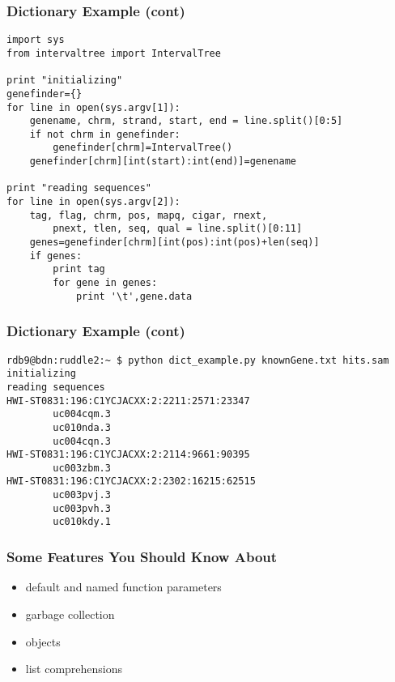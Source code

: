 \documentclass[10pt]{beamer}
\newcommand\smallfont{\fontsize{8pt}{7.2}\selectfont}
\begin{document}
\begin{frame}[fragile]
\frametitle{Dictionary Example (cont)}

\smallfont
\begin{verbatim}
import sys
from intervaltree import IntervalTree

print "initializing"
genefinder={}
for line in open(sys.argv[1]):
    genename, chrm, strand, start, end = line.split()[0:5]
    if not chrm in genefinder:
        genefinder[chrm]=IntervalTree()
    genefinder[chrm][int(start):int(end)]=genename

print "reading sequences"
for line in open(sys.argv[2]):
    tag, flag, chrm, pos, mapq, cigar, rnext, 
        pnext, tlen, seq, qual = line.split()[0:11]
    genes=genefinder[chrm][int(pos):int(pos)+len(seq)]
    if genes:
        print tag
        for gene in genes:
            print '\t',gene.data

\end{verbatim}
\end{frame}

\begin{frame}[fragile]
\frametitle{Dictionary Example (cont)}

\smallfont
\begin{verbatim}
rdb9@bdn:ruddle2:~ $ python dict_example.py knownGene.txt hits.sam
initializing
reading sequences
HWI-ST0831:196:C1YCJACXX:2:2211:2571:23347
        uc004cqm.3
        uc010nda.3
        uc004cqn.3
HWI-ST0831:196:C1YCJACXX:2:2114:9661:90395
        uc003zbm.3
HWI-ST0831:196:C1YCJACXX:2:2302:16215:62515
        uc003pvj.3
        uc003pvh.3
        uc010kdy.1
\end{verbatim}
\end{frame}

\begin{frame}[fragile]
\frametitle{Some Features You Should Know About}

\begin{itemize}
\item default and named function parameters
\item garbage collection
\item objects
\item list comprehensions
\end{itemize}

\end{frame}
\end{document}
